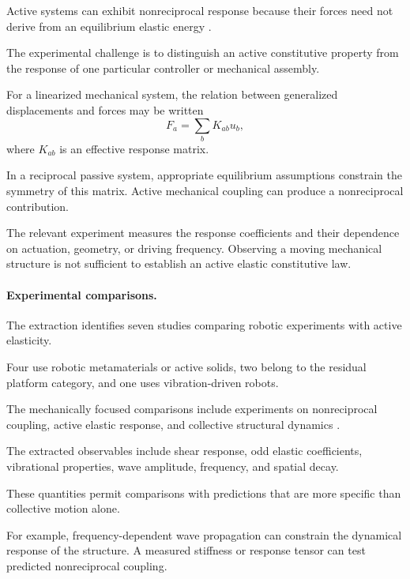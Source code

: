 Active systems can exhibit nonreciprocal response
because their forces need not derive from an
equilibrium elastic energy
\cite{Scheibner2020odd}
\cite{Scheibner2020odd}.

The experimental challenge is to distinguish
an active constitutive property from
the response of one particular controller
or mechanical assembly.

For a linearized mechanical system,
the relation between generalized
displacements and forces may be written
\begin{equation}
F_a=\sum_b K_{ab}u_b,
\label{eq:theory-active-stiffness}
\end{equation}
where $K_{ab}$ is an effective
response matrix.

In a reciprocal passive system,
appropriate equilibrium assumptions
constrain the symmetry of this matrix.
Active mechanical coupling can
produce a nonreciprocal contribution.

The relevant experiment measures
the response coefficients and
their dependence on actuation,
geometry, or driving frequency.
Observing a moving mechanical
structure is not sufficient
to establish an active
elastic constitutive law.

\paragraph*{Experimental comparisons.}

The extraction identifies seven studies
comparing robotic experiments with
active elasticity.

Four use robotic metamaterials
or active solids, two belong
to the residual platform category,
and one uses vibration-driven robots.

The mechanically focused comparisons
include experiments on nonreciprocal
coupling, active elastic response,
and collective structural dynamics
\cite{Brandenbourger2021limitcyclesturnac,Binysh2026moreislessinunpe,Coulais2025activemetamaterials,Chen2020selfsensingmetamat}.

The extracted observables include
shear response,
odd elastic coefficients,
vibrational properties,
wave amplitude,
frequency,
and spatial decay.

These quantities permit
comparisons with predictions
that are more specific
than collective motion
alone.

For example, frequency-dependent
wave propagation can
constrain the dynamical
response of the structure.
A measured stiffness
or response tensor
can test predicted
nonreciprocal coupling.

